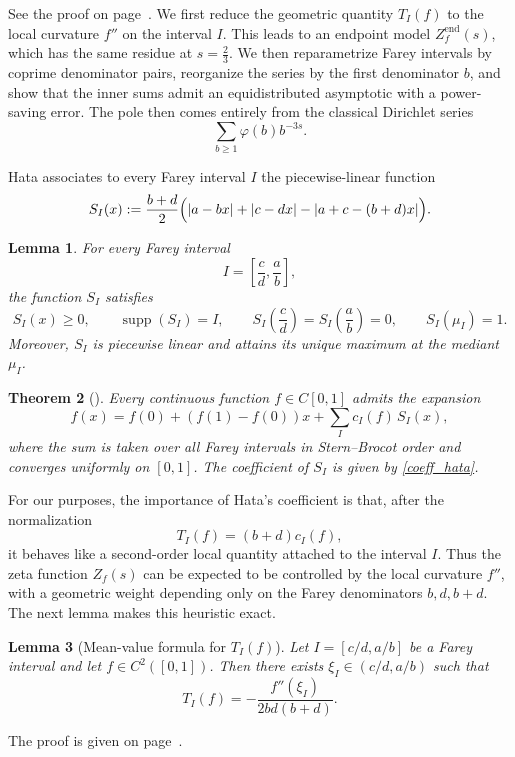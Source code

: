 \documentclass[a4paper,american,11pt]{amsart}
\theoremstyle{plain}
\newtheorem{theorem}{Theorem}[section]
\newtheorem{lemma}[theorem]{Lemma}
\theoremstyle{definition}
\begin{document}
See the proof on page~\pageref{proof:thm:res}. We first reduce the geometric
quantity \(T_I(f)\) to the local curvature \(f''\) on the interval \(I\). This
leads to an endpoint model \(Z_f^{\mathrm{end}}(s)\), which has the same
residue at \(s=\frac23\). We then reparametrize Farey intervals by coprime
denominator pairs, reorganize the series by the first denominator \(b\), and
show that the inner sums admit an equidistributed asymptotic with a
power-saving error. The pole then comes entirely from the classical Dirichlet
series
\[
\sum_{b\ge1}\varphi(b)b^{-3s}.
\]

Hata associates to every Farey interval \(I\) the piecewise-linear function
\cite{Hata1995Farey}
\[
S_I(x)
:=
\frac{b+d}{2}
\Bigl(
|a-bx|+|c-dx|-|a+c-(b+d)x|
\Bigr).
\]

\begin{lemma}
For every Farey interval
\[
I=\left[\frac cd,\frac ab\right],
\]
the function \(S_I\) satisfies
\[
S_I(x)\ge 0,
\qquad
\operatorname{supp}(S_I)=I,
\qquad
S_I\!\left(\frac cd\right)=S_I\!\left(\frac ab\right)=0,
\qquad
S_I(\mu_I)=1.
\]
Moreover, \(S_I\) is piecewise linear and attains its unique maximum at the
mediant \(\mu_I\).
\end{lemma}

\begin{theorem}[\cite{Hata1995Farey}]
Every continuous function \(f\in C[0,1]\) admits the expansion
\[
f(x)=f(0)+(f(1)-f(0))x+\sum_I c_I(f)\,S_I(x),
\]
where the sum is taken over all Farey intervals in Stern--Brocot order and
converges uniformly on \([0,1]\). The coefficient of \(S_I\) is given by
\eqref{coeff_hata}.
\end{theorem}

For our purposes, the importance of Hata's coefficient is that, after the
normalization
\[
T_I(f)=(b+d)c_I(f),
\]
it behaves like a second-order local quantity attached to the interval \(I\).
Thus the zeta function \(Z_f(s)\) can be expected to be controlled by the
local curvature \(f''\), with a geometric weight depending only on the Farey
denominators \(b,d,b+d\). The next lemma makes this heuristic exact.

\begin{lemma}[Mean-value formula for \(T_I(f)\)]
\label{lemma:exactT}
Let \(I=[c/d,a/b]\) be a Farey interval and let \(f\in C^2([0,1])\). Then
there exists \(\xi_I\in(c/d,a/b)\) such that
\[
T_I(f)=-\frac{f''(\xi_I)}{2bd(b+d)}.
\]
\end{lemma}

The proof is given on page~\pageref{proof:lemma:exactT}.
\end{document}
